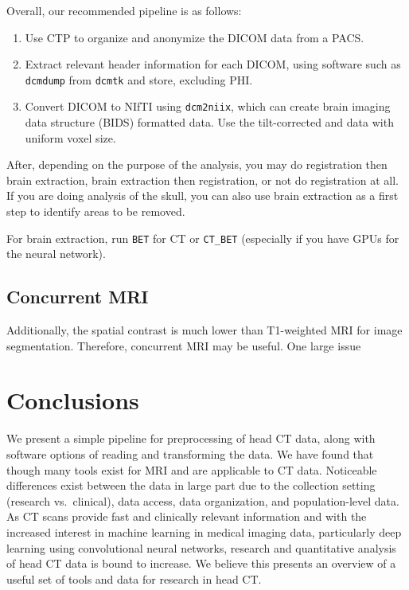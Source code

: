 \documentclass[]{elsarticle} %
\providecommand{\tightlist}{%
  \setlength{\itemsep}{0pt}\setlength{\parskip}{0pt}}
\begin{document}
Overall, our recommended pipeline is as follows:

\begin{enumerate}
\def\labelenumi{\arabic{enumi}.}
\tightlist
\item
  Use CTP to organize and anonymize the DICOM data from a PACS.
\item
  Extract relevant header information for each DICOM, using software
  such as \texttt{dcmdump} from \texttt{dcmtk} and store, excluding PHI.
\item
  Convert DICOM to NIfTI using \texttt{dcm2niix}, which can create brain
  imaging data structure (BIDS) formatted data. Use the tilt-corrected
  and data with uniform voxel size.
\end{enumerate}

After, depending on the purpose of the analysis, you may do registration
then brain extraction, brain extraction then registration, or not do
registration at all. If you are doing analysis of the skull, you can
also use brain extraction as a first step to identify areas to be
removed.

For brain extraction, run \texttt{BET} for CT or \texttt{CT\_BET}
(especially if you have GPUs for the neural network).

\hypertarget{concurrent-mri}{%
\subsection{Concurrent MRI}\label{concurrent-mri}}

Additionally, the spatial contrast is much lower than T1-weighted MRI
for image segmentation. Therefore, concurrent MRI may be useful. One
large issue

\hypertarget{conclusions}{%
\section{Conclusions}\label{conclusions}}

We present a simple pipeline for preprocessing of head CT data, along
with software options of reading and transforming the data. We have
found that though many tools exist for MRI and are applicable to CT
data. Noticeable differences exist between the data in large part due to
the collection setting (research vs.~clinical), data access, data
organization, and population-level data. As CT scans provide fast and
clinically relevant information and with the increased interest in
machine learning in medical imaging data, particularly deep learning
using convolutional neural networks, research and quantitative analysis
of head CT data is bound to increase. We believe this presents an
overview of a useful set of tools and data for research in head CT.
\end{document}
